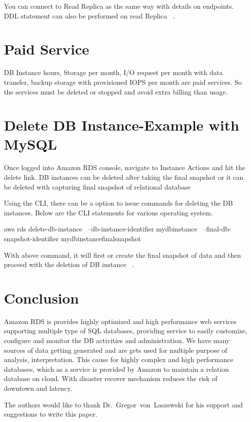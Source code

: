 You can connect to Read Replica as the same way with details on endpoints. 
DDL statement can also be performed on read Replica
~\cite{hid-sp18-520-amazonrdscreatesteps}.

\section{Paid Service}
DB Instance hours, Storage per month, I/O request per month with data transfer,
backup storage with provisioned IOPS per month are paid services.
So the services must be deleted or stopped and avoid extra billing than usage.
~\cite{hid-sp18-520-amazonrdsfaqs}

\section{Delete DB Instance-Example with MySQL}

Once logged into Amazon RDS console, navigate to Instance Actions 
and hit the delete link.
DB instances can be deleted after taking the final snapshot or it can be 
deleted with capturing final snapshot of relational database

Using the CLI, there can be a option to issue commands for deleting the 
DB instances. Below are the CLI statements for various operating system.

aws rds delete-db-instance \
--db-instance-identifier mydbinstance  \
--final-db-snapshot-identifier mydbinstancefinalsnapshot

With above command, it will first or create the final snapshot of data and
then proceed with the deletion of DB instance
~\cite{hid-sp18-520-amazonrdsdel}.

\section{Conclusion}
Amazon RDS is provides highly optimized and high performance web services
supporting multiple type of SQL databases, providing service to easily 
customize, configure and monitor the DB activities and administration.
We have many sources of data getting generated and are gets used for 
multiple purpose of analysis, interpretation. This cause for highly complex
and high performance databases, which as a service is provided by Amazon to 
maintain a relation database on cloud. With disaster recover mechanism reduces
the risk of downtown and latency.

\begin{acks}
  The authors would like to thank Dr.~Gregor~von~Laszewski for his
  support and suggestions to write this paper.
\end{acks}



 
